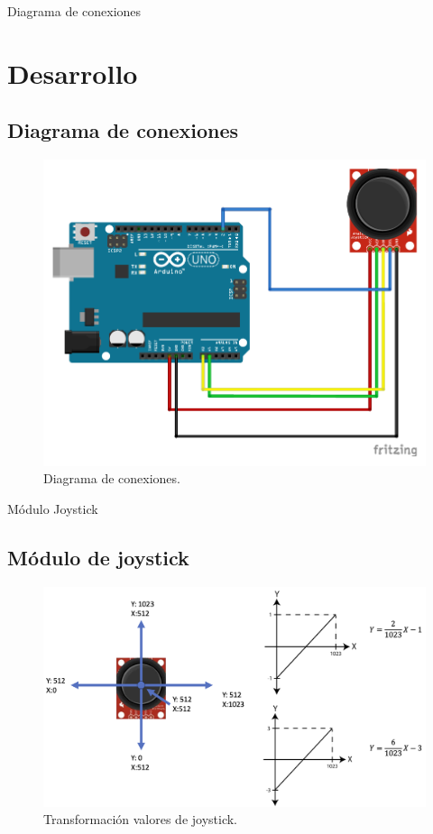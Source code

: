 \documentclass[xcolor=x11names,t]{beamer}
\begin{document}
\begin{frame}{Diagrama de conexiones}
    \section{Desarrollo}
    \subsection{Diagrama de conexiones}
    \begin{figure}
        \centering
        \includegraphics[scale=0.6]{images/diagrama_conexiones.pdf}
        \caption{Diagrama de conexiones.}
        \label{fig:conexiones}
    \end{figure}
\end{frame}

\begin{frame}{Módulo Joystick}
    \subsection{Módulo de joystick}
    \begin{figure}
        \centering
        \includegraphics[scale=0.35]{images/rangojst.png}
        \caption{Transformación valores de joystick.}
        \label{fig:jstk}
    \end{figure}
\end{frame}
\end{document}
